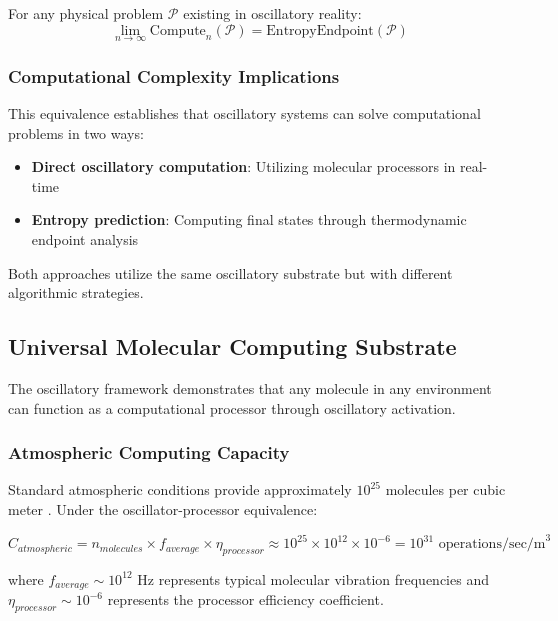 \begin{theorem}
For any physical problem $\mathcal{P}$ existing in oscillatory reality:
\begin{equation}
\lim_{n \to \infty} \text{Compute}_n(\mathcal{P}) = \text{EntropyEndpoint}(\mathcal{P})
\end{equation}
\end{theorem}

\subsubsection{Computational Complexity Implications}

This equivalence establishes that oscillatory systems can solve computational problems in two ways:
\begin{itemize}
\item \textbf{Direct oscillatory computation}: Utilizing molecular processors in real-time
\item \textbf{Entropy prediction}: Computing final states through thermodynamic endpoint analysis
\end{itemize}

Both approaches utilize the same oscillatory substrate but with different algorithmic strategies.

\subsection{Universal Molecular Computing Substrate}

The oscillatory framework demonstrates that any molecule in any environment can function as a computational processor through oscillatory activation.

\subsubsection{Atmospheric Computing Capacity}

Standard atmospheric conditions provide approximately $10^{25}$ molecules per cubic meter \cite{lloyd2000ultimate}. Under the oscillator-processor equivalence:

\begin{equation}
C_{atmospheric} = n_{molecules} \times f_{average} \times \eta_{processor} \approx 10^{25} \times 10^{12} \times 10^{-6} = 10^{31} \text{ operations/sec/m}^3
\end{equation}

where $f_{average} \sim 10^{12}$ Hz represents typical molecular vibration frequencies and $\eta_{processor} \sim 10^{-6}$ represents the processor efficiency coefficient.

